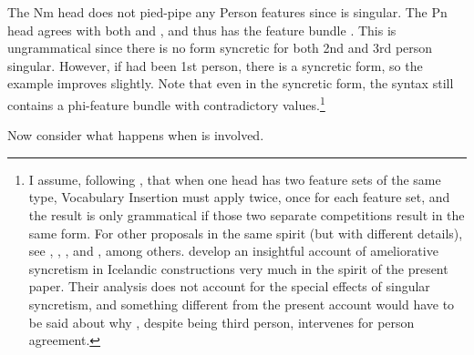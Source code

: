 \documentclass[output=paper]{langscibook}
\begin{document}
The Nm head does not pied-pipe any Person features since  is singular. The Pn head agrees with both  and , and thus has the feature bundle . This is ungrammatical since there is no form syncretic for both 2nd and 3rd person singular. However, if  had been 1st person, there is a syncretic form, so the example improves slightly. Note that even in the syncretic form, the syntax still contains a phi-feature bundle with contradictory values.\footnote{I assume, following \citet{Bjorkman2016}, that when one head has two feature sets of the same type, Vocabulary Insertion must apply twice, once for each feature set, and the result is only grammatical if those two separate competitions result in the same form. For other proposals in the same spirit (but with different details), see \citet{citko2005nature}, \citet{Kratzer:2009jq}, \citet{bhatt2013locating}, \citet{Asarina2013} and  \citet{CoonKeine2020}, among others. \citet{CoonKeine2020} develop an insightful account of ameliorative syncretism in Icelandic  constructions very much in the spirit of the present paper. Their analysis  does not account for the special effects of singular \sti syncretism, and something different from the present account would have to be said about why \stin{}, despite being third person, intervenes for person agreement.  } 


Now consider what happens when \sti is involved. 


\ea {}
    \ex[]
    {
        \gll Mér leiddist hún. \\
            me\dat{} bored\gl{1/2/3sg} she\gl{sg} \\
        \glt `I found her boring.'
    \jambox*{\citep[16]{SigOnt}}%
    }
    \z
\z
\end{document}
